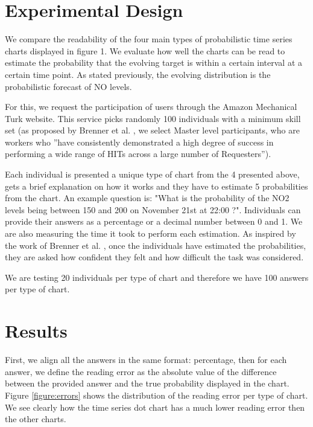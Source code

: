 \documentclass[a4paper,3p,sort&compress]{elsarticle}
\begin{document}
\section{Experimental Design}
\label{sec:exp_design}

We compare the readability of the four main types of probabilistic time series charts 
displayed in figure 1. We evaluate how well the charts can be read to estimate the probability 
that the evolving target is within a certain interval at a certain time point. As stated previously, 
the evolving distribution is the probabilistic forecast of NO levels. 

For this, we request the participation of users through the Amazon Mechanical Turk website. 
This service picks randomly 100 individuals with a minimum skill set (as proposed by Brenner 
et al. \cite{brennen_instrument_2018}, we select Master level participants, who are workers who 
''have consistently demonstrated a high degree of success in performing a wide range of HITs across a 
large number of Requesters'').

Each individual is presented a unique type of chart from the 4 presented above, gets a brief 
explanation on how it works and they have to estimate 5 probabilities from the chart. An example question is: 
"What is the probability of the NO2 levels being between 150 and 200 on 
November 21st at 22:00 ?". Individuals can provide their answers as a percentage or a 
decimal number between 0
and 1. We are also measuring the time it took to perform each estimation. 
As inspired by the work of Brenner et 
al. , once the individuals have estimated the probabilities, they are asked how confident they 
felt and how difficult the task was considered.

We are testing 20 individuals per type of chart and therefore we have 100 answers per 
type of chart.

\section{Results}
\label{sec:results}

First, we align all the answers in the same format: percentage, then for each answer, we define the 
reading error as the absolute value of the difference 
between the provided answer and the true probability displayed in the chart. Figure \ref{figure:errors} shows 
the distribution of the reading error per type of chart. We see clearly how the time series dot chart
has a much lower reading error then the other charts. 
\end{document}
